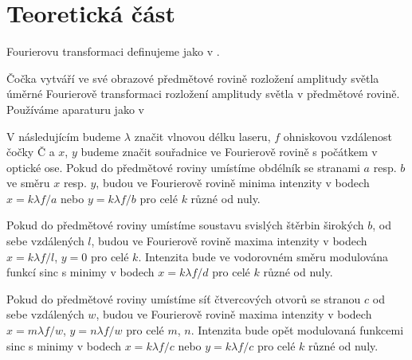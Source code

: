 \section*{Teoretická část}
Fourierovu transformaci definujeme jako v \cite{cerny}.


Čočka vytváří ve své obrazové předmětové rovině rozložení amplitudy světla úměrné Fourierově transformaci rozložení amplitudy světla v předmětové rovině. \cite{skripta}
Používáme aparaturu jako v \cite{skripta}


V následujícím budeme $\lambda$ značit vlnovou délku laseru, $f$ ohniskovou vzdálenost čočky Č a $x$, $y$ budeme značit souřadnice ve Fourierově rovině s počátkem v optické ose. Pokud do předmětové roviny umístíme obdélník se stranami $a$ resp. $b$ ve směru $x$ resp. $y$, budou ve Fourierově rovině minima intenzity v bodech
$x = k\lambda f /a$ nebo $y=k\lambda f/b$ pro celé $k$ různé od nuly. \cite{maly}

Pokud do předmětové roviny umístíme soustavu svislých štěrbin širokých $b$, od sebe vzdálených $l$, budou ve Fourierově rovině maxima intenzity v bodech $x=k\lambda f/l$, $y=0$ pro celé $k$. Intenzita bude ve vodorovném směru modulována funkcí sinc s minimy v bodech $x=k\lambda f/d$ pro celé $k$ různé od nuly. \cite{maly}

Pokud do předmětové roviny umístíme síť čtvercových otvorů se stranou $c$ od sebe vzdálených $w$, budou ve Fourierově rovině maxima intenzity v bodech $x=m\lambda f/w$, $y=n\lambda f/w$ pro celé $m$, $n$. Intenzita bude opět modulovaná funkcemi sinc s minimy v bodech $x=k\lambda f/c$ nebo $y=k\lambda f/c$ pro celé $k$ různé od nuly.